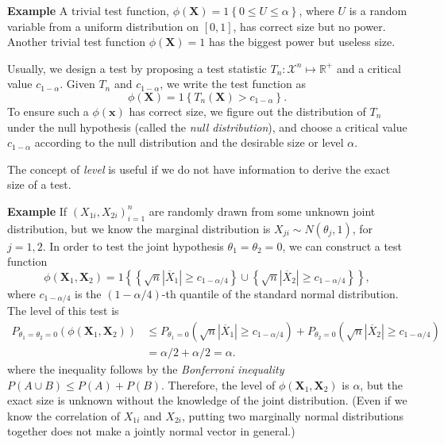\documentclass[11pt]{article}
\begin{document}
\textbf{Example} A trivial test function,
\(\phi(\mathbf{X})=1\left\{ 0\leq U\leq\alpha\right\}\), where \(U\) is
a random variable from a uniform distribution on \(\left[0,1\right]\),
has correct size but no power. Another trivial test function
\(\phi\left(\mathbf{X}\right)=1\) has the biggest power but useless
size.

    Usually, we design a test by proposing a test statistic
\(T_{n}:\mathcal{X}^{n}\mapsto\mathbb{R}^{+}\) and a critical value
\(c_{1-\alpha}\). Given \(T_n\) and \(c_{1-\alpha}\), we write the test
function as
\[\phi\left(\mathbf{X}\right)=1\left\{ T_{n}\left(\mathbf{X}\right)>c_{1-\alpha}\right\}.\]
To ensure such a \(\phi\left(\mathbf{x}\right)\) has correct size, we
figure out the distribution of \(T_{n}\) under the null hypothesis
(called the \emph{null distribution}), and choose a critical value
\(c_{1-\alpha}\) according to the null distribution and the desirable
size or level \(\alpha\).

The concept of \emph{level} is useful if we do not have information to
derive the exact size of a test.

\textbf{Example} If \(\left(X_{1i},X_{2i}\right)_{i=1}^{n}\) are
randomly drawn from some unknown joint distribution, but we know the
marginal distribution is \(X_{ji}\sim N\left(\theta_{j},1\right)\), for
\(j=1,2\). In order to test the joint hypothesis
\(\theta_{1}=\theta_{2}=0\), we can construct a test function
\[\phi\left(\mathbf{X}_{1},\mathbf{X}_{2}\right)=1\left\{ \left\{ \sqrt{n}\left|\overline{X}_{1}\right|\geq c_{1-\alpha/4}\right\} \cup\left\{ \sqrt{n}\left|\overline{X}_{2}\right|\geq c_{1-\alpha/4}\right\} \right\} ,\]
where \(c_{1-\alpha/4}\) is the \(\left(1-\alpha/4\right)\)-th quantile
of the standard normal distribution. The level of this test is
\[\begin{aligned}
P_{\theta_{1}=\theta_{2}=0}\left(\phi\left(\mathbf{X}_{1},\mathbf{X}_{2}\right)\right) & \leq P_{\theta_{1}=0}\left(\sqrt{n}\left|\overline{X}_{1}\right|\geq c_{1-\alpha/4}\right)+P_{\theta_{2}=0}\left(\sqrt{n}\left|\overline{X}_{2}\right|\geq c_{1-\alpha/4}\right)\\
 & =\alpha/2+\alpha/2=\alpha.\end{aligned}\] where the inequality
follows by the \emph{Bonferroni inequality}
\(P\left(A\cup B\right)\leq P\left(A\right)+P\left(B\right)\).
Therefore, the level of
\(\phi\left(\mathbf{X}_{1},\mathbf{X}_{2}\right)\) is \(\alpha\), but
the exact size is unknown without the knowledge of the joint
distribution. (Even if we know the correlation of \(X_{1i}\) and
\(X_{2i}\), putting two marginally normal distributions together does
not make a jointly normal vector in general.)
\end{document}
